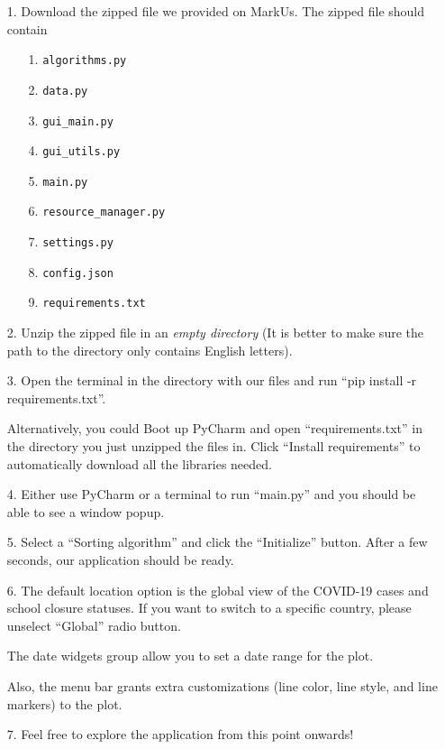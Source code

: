 \documentclass[fontsize=11pt]{article}
\begin{document}
    \begin{enumerate}
        \item [1.]
            Download the zipped file we provided on MarkUs. The zipped file should contain 
            \begin{enumerate}
                \item [1.] \verb|algorithms.py|
                \item [2.] \verb|data.py|
                \item [3.] \verb|gui_main.py|
                \item [4.] \verb|gui_utils.py|
                \item [5.] \verb|main.py|
                \item [6.] \verb|resource_manager.py|
                \item [7.] \verb|settings.py|
                \item [8.] \verb|config.json|
                \item [9.] \verb|requirements.txt|
            \end{enumerate}

        \item [2.]
            Unzip the zipped file in an \emph{empty directory} (It is better to make sure the path to the directory only contains English letters).
        \item [3.]
            Open the terminal in the directory with our files and run ``pip install -r requirements.txt''.

            Alternatively, you could Boot up PyCharm and open ``requirements.txt'' in the directory you just unzipped the files in. Click ``Install requirements'' to automatically download all the libraries needed.

        \item [4.]
            Either use PyCharm or a terminal to run ``main.py'' and you should be able to see a window popup.

        \item [5.]
            Select a ``Sorting algorithm'' and click the ``Initialize'' button. After a few seconds, our application should be ready.

        \item [6.]
            The default location option is the global view of the COVID-19 cases and school closure statuses. If you want to switch to a specific country, please unselect ``Global'' radio button.

            The date widgets group allow you to set a date range for the plot.

            Also, the menu bar grants extra customizations (line color, line style, and line markers) to the plot.

        \item [7.]
            Feel free to explore the application from this point onwards!

    \end{enumerate}
\end{document}
